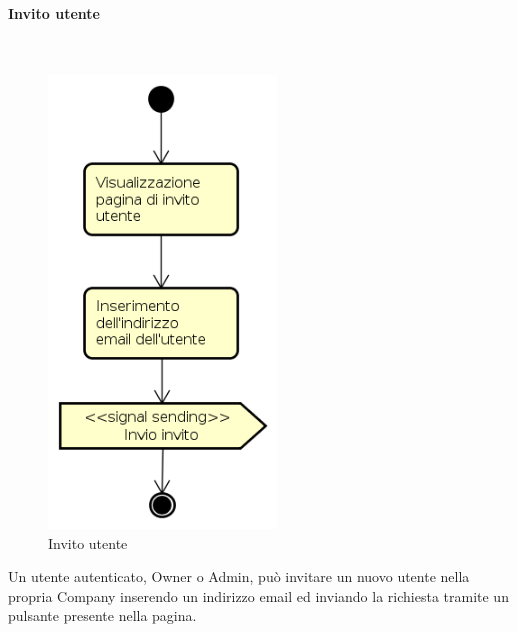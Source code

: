 \paragraph{Invito utente} \mbox{} \\
\begin{figure}[H]
\begin{center}
\includegraphics[height=12cm]{res/sections/backend/activities/invitoUtente.png}
\caption{Invito utente}
\end{center}
\end{figure}
Un utente autenticato, Owner o Admin, può invitare un nuovo utente nella propria Company inserendo un indirizzo email ed inviando la richiesta tramite un pulsante presente nella pagina.
